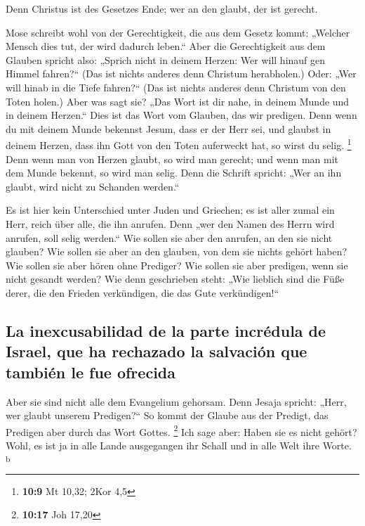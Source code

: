  Denn Christus ist des Gesetzes Ende; wer an den glaubt,
der ist gerecht.

 Mose schreibt wohl von der Gerechtigkeit, die aus dem
Gesetz kommt: „Welcher Mensch dies tut, der wird dadurch leben.``
 Aber die Gerechtigkeit aus dem Glauben spricht also:
„Sprich nicht in deinem Herzen: Wer will hinauf gen Himmel fahren?{}``
(Das ist nichts anderes denn Christum herabholen.)  Oder:
„Wer will hinab in die Tiefe fahren?{}`` (Das ist nichts anderes denn
Christum von den Toten holen.)  Aber was sagt sie? „Das
Wort ist dir nahe, in deinem Munde und in deinem Herzen.`` Dies ist das
Wort vom Glauben, das wir predigen.  Denn wenn du mit
deinem Munde bekennst Jesum, dass er der Herr sei, und glaubst in deinem
Herzen, dass ihn Gott von den Toten auferweckt hat, so wirst du selig.
\footnote{\textbf{10:9} Mt 10,32; 2Kor 4,5}  Denn wenn
man von Herzen glaubt, so wird man gerecht; und wenn man mit dem Munde
bekennt, so wird man selig.  Denn die Schrift spricht:
„Wer an ihn glaubt, wird nicht zu Schanden werden.``

 Es ist hier kein Unterschied unter Juden und Griechen;
es ist aller zumal ein Herr, reich über alle, die ihn anrufen.
 Denn „wer den Namen des Herrn wird anrufen, soll selig
werden.``  Wie sollen sie aber den anrufen, an den sie
nicht glauben? Wie sollen sie aber an den glauben, von dem sie nichts
gehört haben? Wie sollen sie aber hören ohne Prediger? 
Wie sollen sie aber predigen, wenn sie nicht gesandt werden? Wie denn
geschrieben steht: „Wie lieblich sind die Füße derer, die den Frieden
verkündigen, die das Gute verkündigen!{}``

\hypertarget{la-inexcusabilidad-de-la-parte-incruxe9dula-de-israel-que-ha-rechazado-la-salvaciuxf3n-que-tambiuxe9n-le-fue-ofrecida}{%
\subsection{La inexcusabilidad de la parte incrédula de Israel, que ha
rechazado la salvación que también le fue
ofrecida}\label{la-inexcusabilidad-de-la-parte-incruxe9dula-de-israel-que-ha-rechazado-la-salvaciuxf3n-que-tambiuxe9n-le-fue-ofrecida}}

 Aber sie sind nicht alle dem Evangelium gehorsam. Denn
Jesaja spricht: „Herr, wer glaubt unserem Predigen?{}`` 
So kommt der Glaube aus der Predigt, das Predigen aber durch das Wort
Gottes. \footnote{\textbf{10:17} Joh 17,20}  Ich sage
aber: Haben sie es nicht gehört? Wohl, es ist ja in alle Lande
ausgegangen ihr Schall und in alle Welt ihre Worte. \textsuperscript{b}

